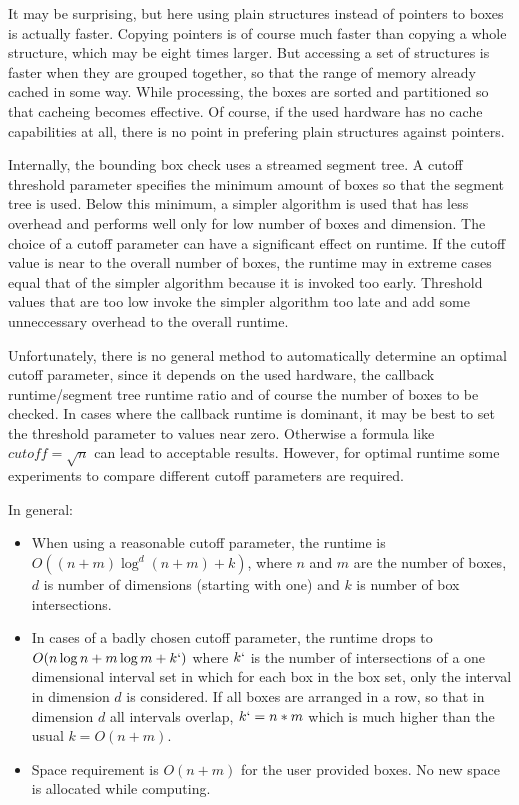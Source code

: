 It may be surprising, but here using plain structures instead of
pointers to boxes is actually faster. Copying pointers is of course
much faster than copying a whole structure, which may be eight times
larger. But accessing a set of structures is faster when they are
grouped together, so that the range of memory already cached in some
way. While processing, the boxes are sorted and partitioned so that
cacheing becomes effective. Of course, if the used hardware has no
cache capabilities at all, there is no point in prefering plain
structures against pointers.


Internally, the bounding box check uses a streamed segment tree. A
cutoff threshold parameter specifies the minimum amount of boxes so
that the segment tree is used. Below this minimum, a simpler algorithm
is used that has less overhead and performs well only for low number
of boxes and dimension. The choice of a cutoff parameter can have a
significant effect on runtime. If the cutoff value is near to the
overall number of boxes, the runtime may in extreme cases equal that
of the simpler algorithm because it is invoked too early. Threshold
values that are too low invoke the simpler algorithm too late and add
some unneccessary overhead to the overall runtime.

Unfortunately, there is no general method to automatically determine
an optimal cutoff parameter, since it depends on the used hardware,
the callback runtime/segment tree runtime ratio and of course the
number of boxes to be checked. In cases where the callback runtime is
dominant, it may be best to set the threshold parameter to values near
zero. Otherwise a formula like $cutoff=\sqrt{n}$ can lead to
acceptable results. However, for optimal runtime some experiments to
compare different cutoff parameters are required.

In general:

\begin{itemize}
    \item
      When using a reasonable cutoff parameter, the runtime is
      $O((n+m)\log^{d}(n+m)+k)$, where $n$ and $m$ are the number of
      boxes, $d$ is number of dimensions (starting with one) and $k$
      is number of box intersections. 
    \item
      In cases of a badly chosen cutoff parameter, the runtime drops
      to $O(n\log n+m\log m+k`)$ where $k`$ is the number of
      intersections of a one dimensional interval set in which for
      each box in the box set, only the interval in dimension $d$ is
      considered. If all boxes are arranged in a row, so that in
      dimension $d$ all intervals overlap, $k`=n*m$ which is much
      higher than the usual $k=O(n+m)$. 
    \item
      Space requirement is $O(n+m)$ for the user provided boxes. No
      new space is allocated while computing.  
\end{itemize}

